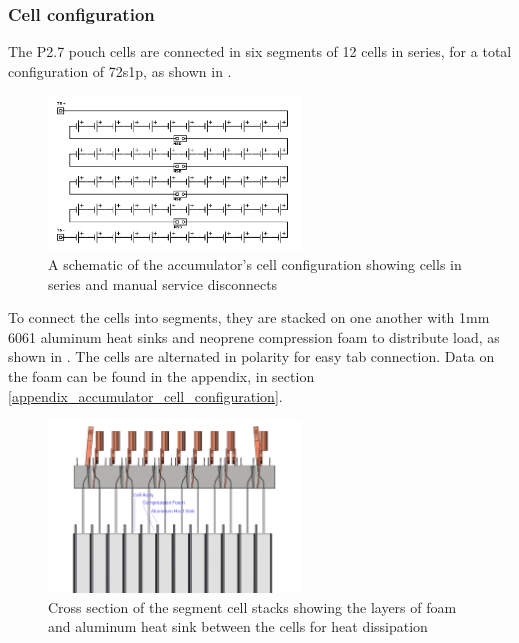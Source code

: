 \documentclass{article}
\begin{document}
\subsubsection{Cell configuration}\label{accumulator_cell_configuration}
The P2.7 pouch cells are connected in six segments of 12 cells in series, for a total configuration of 72s1p, as shown in . 

\begin{figure}[H]
\centering
\includegraphics[width=0.6\textwidth]{Cell-configuration-schematic.png}
\caption{A schematic of the accumulator's cell configuration showing cells in series and manual service disconnects}
\label{fig:cell_configuration_schematic}
\end{figure}

To connect the cells into segments, they are stacked on one another with 1mm 6061 aluminum heat sinks and neoprene compression foam to distribute load, as shown in . The cells are alternated in polarity for easy tab connection. Data on the foam can be found in the appendix, in section \ref{appendix_accumulator_cell_configuration}.

\begin{figure}[H]
\centering
\includegraphics[width=0.6\textwidth]{accumulator_cross_section}
\caption{Cross section of the segment cell stacks showing the layers of foam and aluminum heat sink between the cells for heat dissipation}
\label{fig:cell_stack}
\end{figure}
\end{document}
